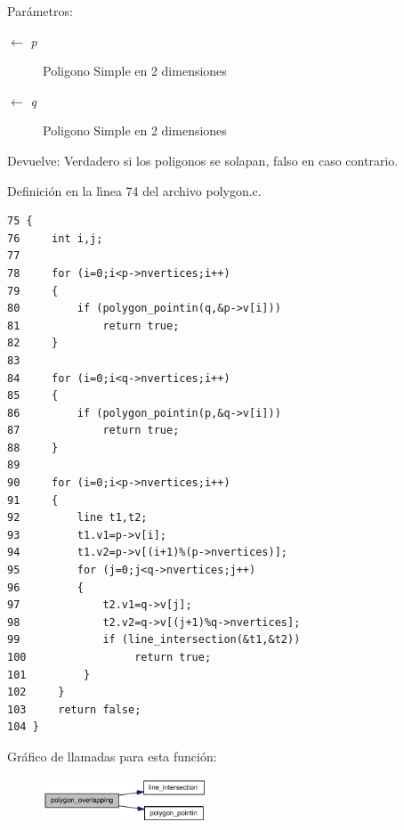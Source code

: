 \begin{Desc}
\item[Par\'{a}metros:]
\begin{description}
\item[\mbox{$\leftarrow$} {\em p}]Poligono Simple en 2 dimensiones \item[\mbox{$\leftarrow$} {\em q}]Poligono Simple en 2 dimensiones \end{description}
\end{Desc}
\begin{Desc}
\item[Devuelve:]Verdadero si los poligonos se solapan, falso en caso contrario. \end{Desc}


Definici\'{o}n en la l\'{\i}nea 74 del archivo polygon.c.

\begin{Code}\begin{verbatim}75 {
76     int i,j;
77 
78     for (i=0;i<p->nvertices;i++)
79     {
80         if (polygon_pointin(q,&p->v[i]))
81             return true;
82     }
83 
84     for (i=0;i<q->nvertices;i++)
85     {
86         if (polygon_pointin(p,&q->v[i]))
87             return true;
88     }
89 
90     for (i=0;i<p->nvertices;i++)
91     {
92         line t1,t2;
93         t1.v1=p->v[i];
94         t1.v2=p->v[(i+1)%(p->nvertices)];
95         for (j=0;j<q->nvertices;j++)
96         {
97             t2.v1=q->v[j];
98             t2.v2=q->v[(j+1)%q->nvertices];
99             if (line_intersection(&t1,&t2))
100                 return true;
101         }
102     }
103     return false;
104 }
\end{verbatim}\end{Code}




Gr\'{a}fico de llamadas para esta funci\'{o}n:\begin{figure}[H]
\begin{center}
\leavevmode
\includegraphics[width=139pt]{group__geometry_g2be6101a257ea8896e61e93d14b22b89_g2be6101a257ea8896e61e93d14b22b89_cgraph}
\end{center}
\end{figure}


